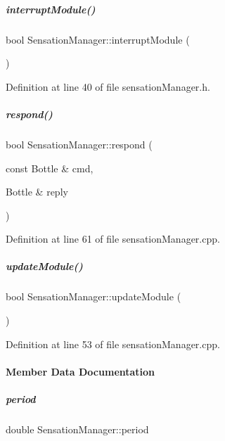 \mbox{\label{group__sensationManager_a8dc43f39792154ea23b5421d24e05cf1}} 
\subparagraph{\texorpdfstring{interrupt\+Module()}{interruptModule()}}
{\footnotesize\ttfamily bool Sensation\+Manager\+::interrupt\+Module (\begin{DoxyParamCaption}{ }\end{DoxyParamCaption})\hspace{0.3cm}{\ttfamily [inline]}}



Definition at line 40 of file sensation\+Manager.\+h.

\mbox{\label{group__sensationManager_a3df7a41b8c463ba9756d6910be0f64f2}} 
\subparagraph{\texorpdfstring{respond()}{respond()}}
{\footnotesize\ttfamily bool Sensation\+Manager\+::respond (\begin{DoxyParamCaption}\item[{const Bottle \&}]{cmd,  }\item[{Bottle \&}]{reply }\end{DoxyParamCaption})}



Definition at line 61 of file sensation\+Manager.\+cpp.

\mbox{\label{group__sensationManager_aa3d9294b7413c080bab7e516373e33ae}} 
\subparagraph{\texorpdfstring{update\+Module()}{updateModule()}}
{\footnotesize\ttfamily bool Sensation\+Manager\+::update\+Module (\begin{DoxyParamCaption}{ }\end{DoxyParamCaption})}



Definition at line 53 of file sensation\+Manager.\+cpp.



\paragraph{Member Data Documentation}
\mbox{\label{group__sensationManager_accc331f6981ef5aed03e61203a3d801f}} 
\subparagraph{\texorpdfstring{period}{period}}
{\footnotesize\ttfamily double Sensation\+Manager\+::period\hspace{0.3cm}{\ttfamily [protected]}}




